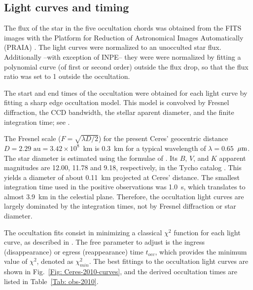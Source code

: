 \documentclass[useAMS,usenatbib]{mn2e}
\begin{document}
\subsection{Light curves and timing \label{Sec: light-curve-2010}}

The flux of the star in the five occultation chords was obtained from the FITS images with the Platform for Reduction of Astronomical Images Automatically (PRAIA) \citep{2011gfun.conf...85A}. The light curves were normalized to an unocculted star flux. Additionally --with exception of INPE-- they were were normalized by fitting a polynomial curve (of first or second order) outside the flux drop, so that the flux ratio was set to 1 outside the occultation.

The start and end times of the occultation were obtained for each light curve by fitting a sharp edge occultation model. This model is convolved by Fresnel diffraction, the CCD bandwidth, the stellar aparent diameter, and the finite integration time; see \cite{Widemann2009}.

The Fresnel scale ($F = \sqrt{\lambda D/2}$) for the present Ceres' geocentric distance $D = 2.29 \text{ au} = 3.42 \times 10^{8}$~km is 0.3~km for a typical wavelength of $\lambda = 0.65$~$\hbox{$\mu$m}$. The star diameter is estimated using the formulae of \cite{vanBelle1999}. Its $B$, $V$, and $K$ apparent magnitudes are 12.00, 11.78 and 9.18, respectively, in the Tycho catalog \citep{Hog2000}. This yields a diameter of about 0.11~km projected at Ceres' distance. The smallest integration time used in the positive observations was 1.0~s, which translates to almost 3.9~km in the celestial plane. Therefore, the occultation light curves are largely dominated by the integration times, not by Fresnel diffraction or star diameter.

The occultation fits consist in minimizing a classical $\chi^{2}$ function for each light curve, as described in \cite{Sicardy2011}. The free parameter to adjust is the ingress (disappearance) or egress (reappearance) time $t_{occ}$, which provides the minimum value of $\chi^{2}$, denoted as $\chi^{2}_{min}$. The best fittings to the occultation light curves are shown in Fig.~\ref{Fig: Ceres-2010-curves}, and the derived occultation times are listed in Table~\ref{Tab: obs-2010}.
\end{document}
